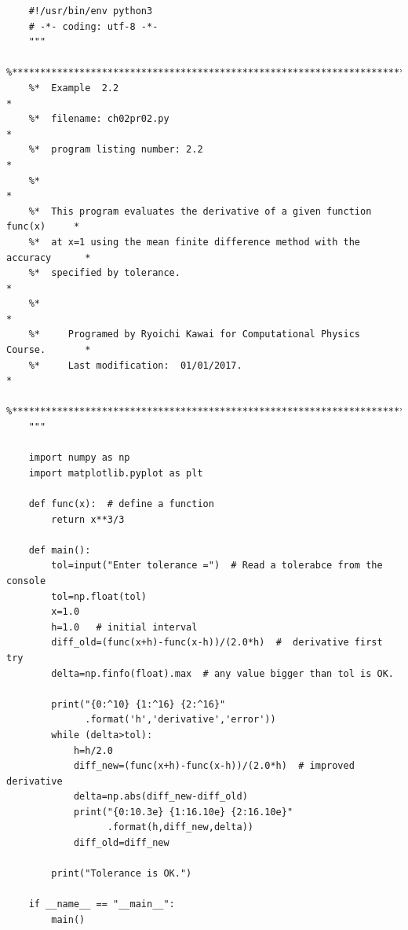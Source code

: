 
\footnotesize
\begin{verbatim}
    #!/usr/bin/env python3
    # -*- coding: utf-8 -*-
    """
    %**************************************************************************
    %*  Example  2.2                                                          *
    %*  filename: ch02pr02.py                                                 *
    %*  program listing number: 2.2                                           *
    %*                                                                        *
    %*  This program evaluates the derivative of a given function func(x)     *
    %*  at x=1 using the mean finite difference method with the accuracy      *
    %*  specified by tolerance.                                               *
    %*                                                                        *
    %*     Programed by Ryoichi Kawai for Computational Physics Course.       *
    %*     Last modification:  01/01/2017.                                    *
    %**************************************************************************
    """
    
    import numpy as np
    import matplotlib.pyplot as plt
           
    def func(x):  # define a function
        return x**3/3
    
    def main():
        tol=input("Enter tolerance =")  # Read a tolerabce from the console
        tol=np.float(tol)
        x=1.0
        h=1.0   # initial interval
        diff_old=(func(x+h)-func(x-h))/(2.0*h)  #  derivative first try
        delta=np.finfo(float).max  # any value bigger than tol is OK.
    
        print("{0:^10} {1:^16} {2:^16}"
              .format('h','derivative','error'))
        while (delta>tol):
            h=h/2.0
            diff_new=(func(x+h)-func(x-h))/(2.0*h)  # improved derivative
            delta=np.abs(diff_new-diff_old)
            print("{0:10.3e} {1:16.10e} {2:16.10e}"
                  .format(h,diff_new,delta))
            diff_old=diff_new
            
        print("Tolerance is OK.")
        
    if __name__ == "__main__":
        main()
\end{verbatim}
        
\normalsize
\vfill



